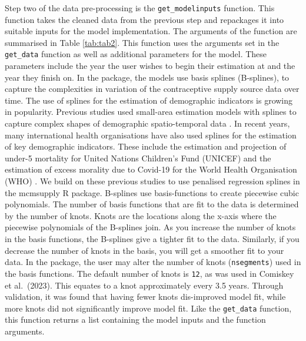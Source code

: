 Step two of the data pre-processing is the \texttt{get\_modelinputs} function. This function takes the cleaned data from the previous step and repackages it into suitable inputs for the model implementation. The arguments of the function are summarised in Table \ref{tab:tab2}. This function uses the arguments set in the \texttt{get\_data} function as well as additional parameters for the model. These parameters include the year the user wishes to begin their estimation at and the year they finish on. In the  package, the models use basis splines (B-splines), to capture the complexities in variation of the contraceptive supply source data over time. The use of splines for the estimation of demographic indicators is growing in popularity. Previous studies used small-area estimation models with splines to capture complex shapes of demographic spatio-temporal data \citep{Ugarte2010, Ugarte2009}. In recent years, many international health organisations have also used splines for the estimation of key demographic indicators. These include the estimation and projection of under-5 mortality for United Nations Children's Fund (UNICEF) \citep{Sharrow2019} and the estimation of excess morality due to Covid-19 for the World Health Organisation (WHO) \citep{Knutson2023}. We build on these previous studies to use penalised regression splines in the mcmsupply R package. B-splines use basis-functions to create piecewise cubic polynomials. The number of basis functions that are fit to the data is determined by the number of knots. Knots are the locations along the x-axis where the piecewise polynomials of the B-splines join. As you increase the number of knots in the basis functions, the B-splines give a tighter fit to the data. Similarly, if you decrease the number of knots in the basis, you will get a smoother fit to your data. In the  package, the user may alter the number of knots (\texttt{nsegments}) used in the basis functions. The default number of knots is \texttt{12}, as was used in Comiskey et al.~(2023). This equates to a knot approximately every 3.5 years. Through validation, it was found that having fewer knots dis-improved model fit, while more knots did not significantly improve model fit. Like the \texttt{get\_data} function, this function returns a list containing the model inputs and the function arguments.

